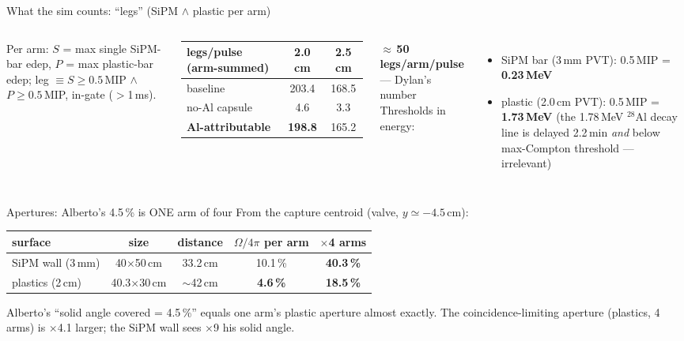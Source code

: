 \documentclass[aspectratio=169,11pt]{beamer}
\newcommand{\good}[1]{\textcolor{caqua}{#1}}
\newcommand{\bad}[1]{\textcolor{corange}{#1}}
\begin{document}
\begin{frame}{What the sim counts: ``legs'' (SiPM $\wedge$ plastic per arm)}
  \small
  \begin{columns}[T]
    Per arm: $S$ = max single SiPM-bar edep, $P$ = max plastic-bar edep;
    leg $\equiv S\geq0.5$\,MIP $\wedge$ $P\geq0.5$\,MIP, in-gate ($>$1\,ms).
    \medskip

    \begin{tabular}{lcc}
      \toprule
      legs/pulse (arm-summed) & 2.0 cm & 2.5 cm \\
      \midrule
      baseline & 203.4 & 168.5 \\
      no-Al capsule & 4.6 & 3.3 \\
      \textbf{Al-attributable} & \textbf{198.8} & 165.2 \\
      \bottomrule
    \end{tabular}
    \smallskip

    $\approx$\,\textbf{50 legs/arm/pulse} --- Dylan's number \good{\checkmark}
    Thresholds in energy:
    \begin{itemize}
      \item SiPM bar (3\,mm PVT): 0.5\,MIP = \textbf{0.23\,MeV}
      \item plastic (2.0\,cm PVT): 0.5\,MIP = \textbf{1.73\,MeV}
            (the 1.78\,MeV $^{28}$Al decay line is delayed 2.2\,min
            \emph{and} below max-Compton threshold --- irrelevant)
    \end{itemize}
  \end{columns}
\end{frame}

\begin{frame}{Apertures: Alberto's 4.5\,\% is ONE arm of four}
  \small
  From the capture centroid (valve, $y\simeq-4.5$\,cm):
  \medskip

  \centering
  \begin{tabular}{lcccc}
    \toprule
    surface & size & distance & $\Omega/4\pi$ per arm & $\times$4 arms \\
    \midrule
    SiPM wall (3\,mm) & 40$\times$50\,cm & 33.2\,cm & 10.1\,\% & \textbf{40.3\,\%} \\
    plastics (2\,cm) & 40.3$\times$30\,cm & $\sim$42\,cm & \textbf{4.6\,\%} & \textbf{18.5\,\%} \\
    \bottomrule
  \end{tabular}
  \medskip

  \raggedright
  Alberto's ``solid angle covered = 4.5\,\%'' equals one arm's plastic
  aperture almost exactly. The coincidence-limiting aperture (plastics,
  4 arms) is \bad{$\times$4.1 larger}; the SiPM wall sees $\times$9 his
  solid angle.
\end{frame}
\end{document}
